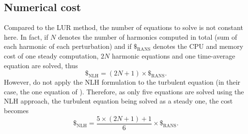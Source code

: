 \subsection{Numerical cost}
Compared to the LUR method, the number of equations to solve is 
not constant here. In fact, if $N$ denotes the number of harmonics
computed in total (sum of each harmonic of each perturbation)
and if $\mathdollar_{\text{RANS}}$ 
denotes the CPU and memory cost of
one steady computation, $2N$ harmonic equations and 
one time-average equation
are solved, thus
\begin{equation}
	\mathdollar_{\text{NLH}} = (2N+1) \times \mathdollar_{\text{RANS}}.
\end{equation}
However, \citet{Vilmin2006} do not apply the NLH formulation
to the turbulent equation (in their case, 
the one equation of \citet{Spalart1992}). Therefore,
as only five equations are solved using the NLH approach, the 
turbulent equation being solved as a steady one,
the cost becomes
\begin{equation}
	\mathdollar_{\text{NLH}} = \frac{5 \times (2N+1) + 1}{6} \times \mathdollar_{\text{RANS}}.
\end{equation}

